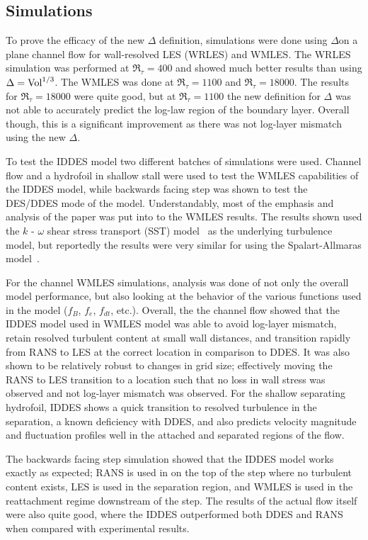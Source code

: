 \documentclass{ucb}
\newcommand{\Ret}{\Re_\tau}
\begin{document}
\subsection{Simulations}

To prove the efficacy of the new \(\Delta \) definition, simulations were done using \(\Delta \)on a plane channel flow for wall-resolved LES (WRLES) and WMLES. The WRLES simulation was performed at \(\Ret = 400 \) and showed much better results than using \(\Delta = \textup{Vol}^{1/3} \). 
The WMLES was done at  \(\Ret = 1100 \) and \(\Ret = 18000 \). The results for \(\Ret = 18000 \) were quite good, but at \(\Ret = 1100\) the new definition for \(\Delta \) was not able to accurately predict the log-law region of the boundary layer. Overall though, this is a significant improvement as there was not log-layer mismatch using the new \(\Delta \).

To test the IDDES model two different batches of simulations were used. Channel flow and a hydrofoil in shallow stall were used to test the WMLES capabilities of the IDDES model, while backwards facing step was shown to test the DES/DDES mode of the model. Understandably, most of the emphasis and analysis of the paper was put into to the WMLES results. The results shown used the \(k \) - \(\omega \) shear stress transport (SST) model~\cite{Menter1994} as the underlying turbulence model, but reportedly the results were very similar for using the Spalart-Allmaras model~\cite{spalartOneequationTurbulenceModel1992}. 

For the channel WMLES simulations, analysis was done of not only the overall model performance, but also looking at the behavior of the various functions used in the model (\(f_B \), \(f_e \), \(f_{dt}\), etc.). Overall, the the channel flow showed that the IDDES model used in WMLES model was able to avoid log-layer mismatch, retain resolved turbulent content at small wall distances, and transition rapidly from RANS to LES at the correct location in comparison to DDES. It was also shown to be relatively robust to changes in grid size; effectively moving the RANS to LES transition to a location such that no loss in  wall stress was observed and not log-layer mismatch was observed. For the shallow separating hydrofoil, IDDES shows a quick transition to resolved turbulence in the separation, a known deficiency with DDES, and also predicts velocity magnitude and fluctuation profiles well in the attached and separated regions of the flow.

The backwards facing step simulation showed that the IDDES model works exactly as expected; RANS is used in on the top of the step where no turbulent content exists, LES is used in the separation region, and WMLES is used in the reattachment regime downstream of the step. The results of the actual flow itself were also quite good, where the IDDES outperformed both DDES and RANS when compared with experimental results.
\end{document}
